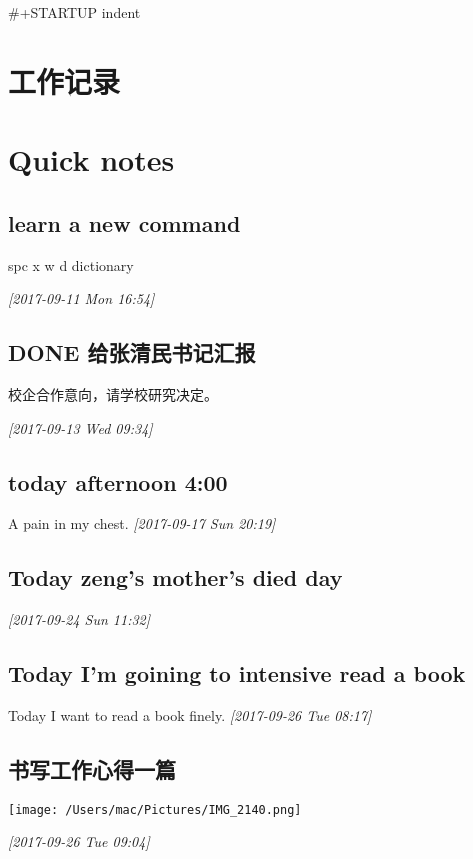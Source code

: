 \documentclass[11pt]{ctexart}
\author{mac}
\date{\today}
\title{}
\begin{document}
\tableofcontents

\#+STARTUP indent
\section{工作记录}
\label{sec:orgaafcede}
\section{Quick notes}
\label{sec:orgb5bca01}

\subsection{learn a new command}
\label{sec:orgfe60dca}
spc x w d dictionary

\textit{[2017-09-11 Mon 16:54]}

\subsection{{\bfseries\sffamily DONE} 给张清民书记汇报}
\label{sec:org1cfeb70}
校企合作意向，请学校研究决定。

\textit{[2017-09-13 Wed 09:34]}

\subsection{today afternoon 4:00}
\label{sec:org138a121}
A pain in my chest.
\textit{[2017-09-17 Sun 20:19]}

\subsection{Today zeng's mother's died day}
\label{sec:org4995e85}

\textit{[2017-09-24 Sun 11:32]}

\subsection{Today I'm goining to intensive read a book}
\label{sec:org7ff6d2c}
Today I want to read a book finely.
\textit{[2017-09-26 Tue 08:17]}

\subsection{书写工作心得一篇}
\label{sec:org058d8bb}
\begin{center}
\texttt{[image: /Users/mac/Pictures/IMG\_2140.png]}
\end{center}
\textit{[2017-09-26 Tue 09:04]}
\end{document}
